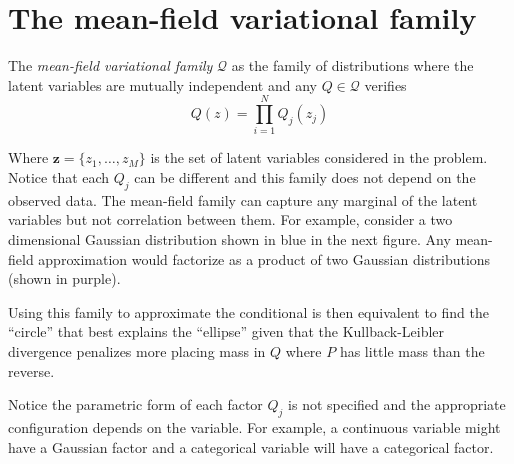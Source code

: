 
\section{The mean-field variational family}

The \emph{mean-field variational family} \(\mathcal{Q}\) as the family of distributions where the latent variables are mutually independent and any \(Q \in \mathcal{Q}\) verifies
\[
  Q(z) = \prod_{i=1}^{N}Q_{j}(z_{j})
\]

Where \(\bm{z} = \{z_{1},\dots,z_{M}\}\) is the set of latent variables considered in the problem. Notice that each \(Q_{j}\) can be different and this family does not depend on the observed data. The mean-field family can capture any marginal of the latent variables but not correlation between them. For example, consider a two dimensional Gaussian distribution shown in blue in the next figure. Any mean-field approximation would factorize as a product of two Gaussian distributions (shown in purple).



\begin{figure}[h!]
\centering
{}
\end{figure}

Using this family to approximate the conditional is then equivalent to find the ``circle'' that best explains the ``ellipse'' given that the Kullback-Leibler divergence penalizes more placing mass in \(Q\) where \(P\) has little mass than the reverse.

Notice the parametric form of each factor \(Q_{j}\) is not specified and the appropriate configuration depends on the variable. For example, a continuous variable might have a Gaussian factor and a categorical variable will have a categorical factor.

